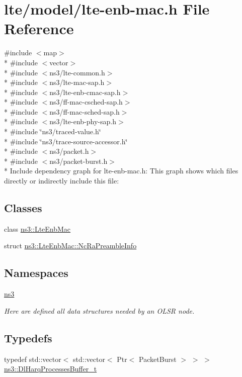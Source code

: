 \hypertarget{lte-enb-mac_8h}{}\section{lte/model/lte-\/enb-\/mac.h File Reference}
\label{lte-enb-mac_8h}
{\ttfamily \#include $<$map$>$}\\*
{\ttfamily \#include $<$vector$>$}\\*
{\ttfamily \#include $<$ns3/lte-\/common.\+h$>$}\\*
{\ttfamily \#include $<$ns3/lte-\/mac-\/sap.\+h$>$}\\*
{\ttfamily \#include $<$ns3/lte-\/enb-\/cmac-\/sap.\+h$>$}\\*
{\ttfamily \#include $<$ns3/ff-\/mac-\/csched-\/sap.\+h$>$}\\*
{\ttfamily \#include $<$ns3/ff-\/mac-\/sched-\/sap.\+h$>$}\\*
{\ttfamily \#include $<$ns3/lte-\/enb-\/phy-\/sap.\+h$>$}\\*
{\ttfamily \#include \char`\"{}ns3/traced-\/value.\+h\char`\"{}}\\*
{\ttfamily \#include \char`\"{}ns3/trace-\/source-\/accessor.\+h\char`\"{}}\\*
{\ttfamily \#include $<$ns3/packet.\+h$>$}\\*
{\ttfamily \#include $<$ns3/packet-\/burst.\+h$>$}\\*
Include dependency graph for lte-\/enb-\/mac.h\+:
This graph shows which files directly or indirectly include this file\+:
\subsection*{Classes}
\begin{DoxyCompactItemize}
\item 
class \hyperlink{classns3_1_1LteEnbMac}{ns3\+::\+Lte\+Enb\+Mac}
\item 
struct \hyperlink{structns3_1_1LteEnbMac_1_1NcRaPreambleInfo}{ns3\+::\+Lte\+Enb\+Mac\+::\+Nc\+Ra\+Preamble\+Info}
\end{DoxyCompactItemize}
\subsection*{Namespaces}
\begin{DoxyCompactItemize}
\item 
 \hyperlink{namespacens3}{ns3}
\begin{DoxyCompactList}\small\item\em Here are defined all data structures needed by an O\+L\+SR node. \end{DoxyCompactList}\end{DoxyCompactItemize}
\subsection*{Typedefs}
\begin{DoxyCompactItemize}
\item 
typedef std\+::vector$<$ std\+::vector$<$ Ptr$<$ Packet\+Burst $>$ $>$ $>$ \hyperlink{namespacens3_aa3c4d208d1d07a2cfcf9c09e4ae4c5af}{ns3\+::\+Dl\+Harq\+Processes\+Buffer\+\_\+t}
\end{DoxyCompactItemize}
